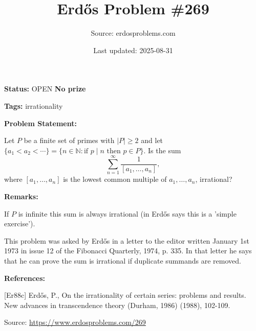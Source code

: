 \documentclass{article}
\title{Erd\H{o}s Problem \#269}
\date{Last updated: 2025-08-31}
\author{Source: erdosproblems.com}
\begin{document}
\maketitle

\noindent\textbf{Status:} OPEN \quad \textbf{No prize}

\noindent\textbf{Tags:} irrationality

\medskip
\noindent\textbf{Problem Statement:}

Let $P$ be a finite set of primes with $\lvert P\rvert \geq 2$ and let $\{a_1<a_2<\cdots\}=\{ n\in \mathbb{N} : \textrm{if }p\mid n\textrm{ then }p\in P\}$. Is the sum\[\sum_{n=1}^\infty \frac{1}{[a_1,\ldots,a_n]},\]where $[a_1,\ldots,a_n]$ is the lowest common multiple of $a_1,\ldots,a_n$, irrational?

\bigskip
\noindent\textbf{Remarks:}

If $P$ is infinite this sum is always irrational (in \cite{Er88c} Erd\H{o}s says this is a 'simple exercise').

This problem was asked by Erd\H{o}s in a letter to the editor written January 1st 1973 in issue 12 of the Fibonacci Quarterly, 1974, p. 335. In that letter he says that he can prove the sum is irrational if duplicate summands are removed.

\bigskip
\noindent\textbf{References:}

[Er88c] Erd\H{o}s, P., On the irrationality of certain series: problems and results. New advances in transcendence theory (Durham, 1986) (1988), 102-109.

\bigskip
\noindent\small{Source: \url{https://www.erdosproblems.com/269}}
\end{document}
